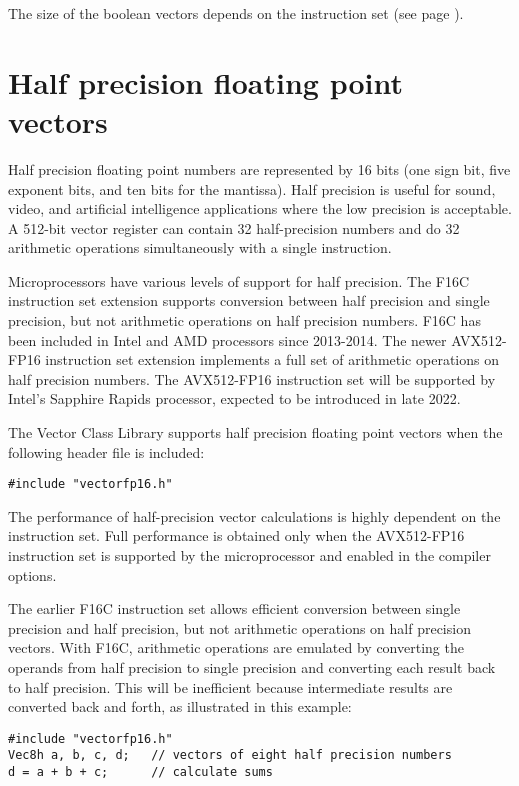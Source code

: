 \documentclass[vcl_manual.tex]{subfiles}
\begin{document}
The size of the boolean vectors depends on the instruction set (see page \pageref{tableBooleanVectorSizes}).


\section{Half precision floating point vectors} \label{HalfPrecision}
Half precision floating point numbers are represented by 16 bits (one sign bit, five exponent bits, and ten bits for the mantissa). Half precision is useful for sound, video, and artificial intelligence applications where the low precision is acceptable. A 512-bit vector register can contain 32 half-precision numbers and do 32 arithmetic operations simultaneously with a single instruction. 

Microprocessors have various levels of support for half precision. The F16C instruction set extension supports conversion between half precision and single precision, but not arithmetic operations on half precision numbers. F16C has been included in Intel and AMD processors since 2013-2014. The newer AVX512-FP16 instruction set extension implements a full set of arithmetic operations on half precision numbers. The AVX512-FP16 instruction set will be supported by Intel's Sapphire Rapids processor, expected to be introduced in late 2022.

The Vector Class Library supports half precision floating point vectors when the following header file is included:
\begin{lstlisting}[frame=single]
#include "vectorfp16.h"
\end{lstlisting}

The performance of half-precision vector calculations is highly dependent on the instruction set. Full performance is obtained only when the AVX512-FP16 instruction set is supported by the microprocessor and enabled in the compiler options.

The earlier F16C instruction set allows efficient conversion between single precision and half precision, but not arithmetic operations on half precision vectors. With F16C, arithmetic operations are emulated by converting the operands from half precision to single precision and converting each result back to half precision. This will be inefficient because intermediate results are converted back and forth, as illustrated in this example:

\begin{lstlisting}[frame=single]
#include "vectorfp16.h"
Vec8h a, b, c, d;   // vectors of eight half precision numbers
d = a + b + c;      // calculate sums
\end{lstlisting}
\end{document}
